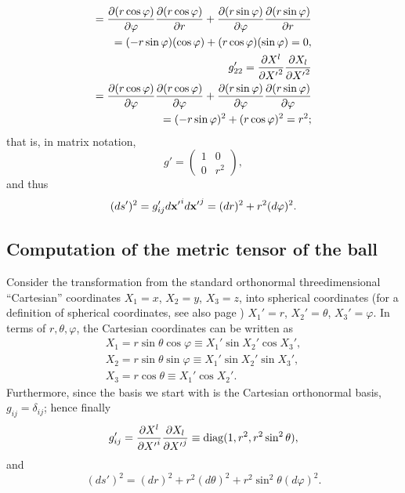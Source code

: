 {\begin{equation}
\begin{split}
=
{\partial (r \cos \varphi) \over \partial {\varphi }}{\partial (r \cos \varphi) \over \partial {r}}
+
{\partial (r \sin \varphi) \over \partial {\varphi }}{\partial (r \sin \varphi) \over \partial {r}}   \\
=
(- r \sin \varphi ) ( \cos \varphi )
+
( r\cos  \varphi )( \sin \varphi )  =0,\\
g'_{22}
= {\partial {X}^l\over \partial {X'}^2}{\partial {X}_l\over \partial {X'}^2} \\
=
{\partial (r \cos \varphi) \over \partial {\varphi}}{\partial (r \cos \varphi) \over \partial {\varphi }}
+
{\partial (r \sin \varphi) \over \partial {\varphi}}{\partial (r \sin \varphi) \over \partial {\varphi }}      \\
=
(- r \sin \varphi )^2
+
( r \cos \varphi )^2  =r^2;
\end{split}
\end{equation}
that is, in matrix notation,
\begin{equation}
g'
=
\begin{pmatrix}
1&0\\
0&r^2
\end{pmatrix}
,
\end{equation}
and thus
\begin{equation}
(d s')^2  = g_{ij}'d{\bf x'}^i d{\bf x'}^j=   (dr)^2 + r^2 (d\varphi )^2.
\label{2014-gppolarc}
\end{equation}







\subsection*{Computation of the metric tensor of the ball}
Consider the transformation from the standard orthonormal
threedimensional ``Cartesian'' coordinates
$X_1=x$,
$X_2=y$,
$X_3=z$,
into spherical coordinates
(for a definition of spherical coordinates, see also page \pageref{2011-m-spericalcoo})
$X_1'=r$,
$X_2'=\theta$,
$X_3'=\varphi$.
In terms of  $r,\theta , \varphi$, the Cartesian coordinates can be written as
\begin{equation}
\begin{split}
 X_1=r \sin \theta \cos \varphi \equiv X_1' \sin X_2' \cos X_3'  , \\
 X_2=r \sin \theta \sin \varphi \equiv X_1'\sin X_2' \sin X_3'  ,    \\
 X_3=r \cos \theta  \equiv X_1'\cos X_2'  .
\end{split}
\end{equation}
Furthermore,  since the basis we start with is the Cartesian orthonormal basis,
$g_{ij}=\delta_{ij}$; hence finally
\begin{equation}
g'_{ij}= {\partial {X}^l\over \partial {X'}^i}{\partial {X}_l\over \partial {X'}^j}
\equiv {\rm diag}(1,r^2,r^2\sin^2 \theta ),
\end{equation}
and
\begin{equation}
(ds')^2 =(dr)^2+r^2(d\theta )^2+r^2\sin^2 \theta (d\varphi )^2.
\end{equation}

}
